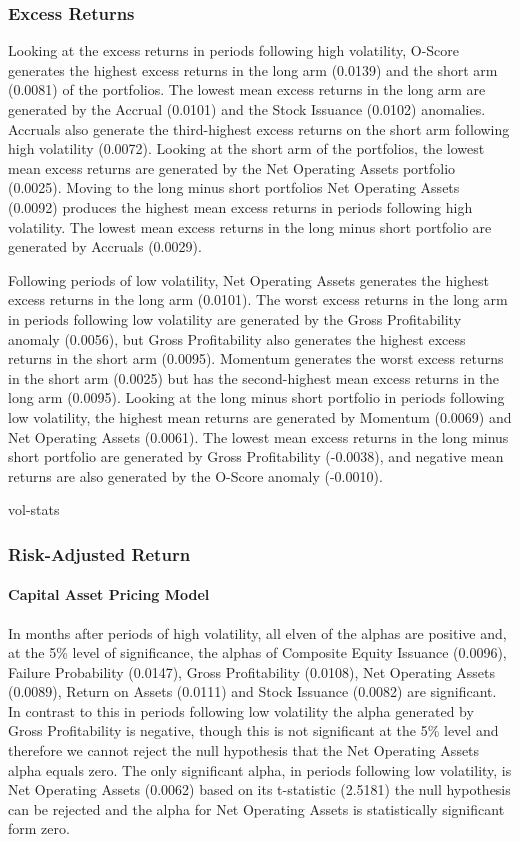 \documentclass[12pt, a4paper, oneside]{article}
\begin{document}
\subsubsection{Excess Returns}
Looking at the excess returns in periods following high volatility, O-Score generates the highest excess returns in the long arm (0.0139) and the short arm (0.0081) of the portfolios. The lowest mean excess returns in the long arm are generated by the Accrual (0.0101) and the Stock Issuance (0.0102) anomalies. Accruals also generate the third-highest excess returns on the short arm following high volatility (0.0072). Looking at the short arm of the portfolios, the lowest mean excess returns are generated by the Net Operating Assets portfolio (0.0025). Moving to the long minus short portfolios Net Operating Assets (0.0092) produces the highest mean excess returns in periods following high volatility. The lowest mean excess returns in the long minus short portfolio are generated by Accruals (0.0029).

Following periods of low volatility, Net Operating Assets generates the highest excess returns in the long arm (0.0101). The worst excess returns in the long arm in periods following low volatility are generated by the Gross Profitability anomaly (0.0056), but Gross Profitability also generates the highest excess returns in the short arm (0.0095).  Momentum generates the worst excess returns in the short arm (0.0025) but has the second-highest mean excess returns in the long arm (0.0095). Looking at the long minus short portfolio in periods following low volatility, the highest mean returns are generated by Momentum (0.0069) and Net Operating Assets (0.0061). The lowest mean excess returns in the long minus short portfolio are generated by Gross Profitability (-0.0038), and negative mean returns are also generated by the O-Score anomaly (-0.0010).

{vol-stats}

\subsubsection{Risk-Adjusted Return}
\paragraph{Capital Asset Pricing Model}
In months after periods of high volatility, all elven of the alphas are positive and, at the 5\% level of significance, the alphas of Composite Equity Issuance (0.0096), Failure Probability (0.0147), Gross Profitability (0.0108), Net Operating Assets (0.0089), Return on Assets (0.0111) and Stock Issuance (0.0082) are significant. In contrast to this in periods following low volatility the alpha generated by Gross Profitability is negative, though this is not significant at the 5\% level and therefore we cannot reject the null hypothesis that the Net Operating Assets alpha equals zero. The only significant alpha, in periods following low volatility, is Net Operating Assets (0.0062) based on its t-statistic (2.5181) the null hypothesis can be rejected and the alpha for Net Operating Assets is statistically significant form zero. 
\end{document}
